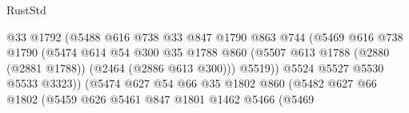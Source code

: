 \begin{lexlean}{RustStd}
\begin{coremodule}
                                          @33
                                          @1792
                                          (@5488
                                            @616
                                            @738
                                            @33
                                            @847
                                            @1790
                                            @863
                                            @744
                                            (@5469
                                              @616
                                              @738
                                              @1790
                                              (@5474
                                                @614
                                                @54
                                                @300
                                                @35
                                                @1788
                                                @860
                                                (@5507
                                                  @613
                                                  @1788
                                                  (@2880 (@2881 @1788))
                                                  (@2464 (@2886 @613 @300)))
                                                @5519))
                                            @5524
                                            @5527
                                            @5530
                                            @5533
                                            @3323))
                                        (@5474
                                          @627
                                          @54
                                          @66
                                          @35
                                          @1802
                                          @860
                                          (@5482
                                            @627
                                            @66
                                            @1802
                                            (@5459
                                              @626
                                              @5461
                                              @847
                                              @1801
                                              @1462
                                              @5466
                                              (@5469

\end{coremodule}
\end{lexlean}
